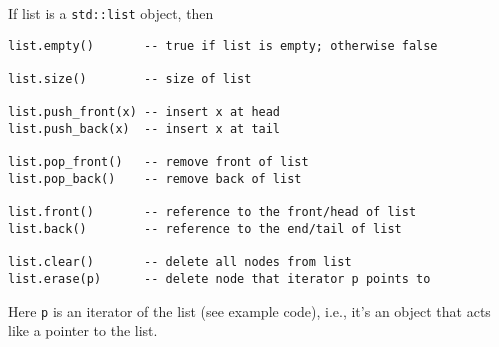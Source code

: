 If list is a \verb!std::list! object, then
{\small
\begin{Verbatim}[frame=single,fontsize=\footnotesize]
list.empty()       -- true if list is empty; otherwise false

list.size()        -- size of list

list.push_front(x) -- insert x at head
list.push_back(x)  -- insert x at tail

list.pop_front()   -- remove front of list
list.pop_back()    -- remove back of list

list.front()       -- reference to the front/head of list
list.back()        -- reference to the end/tail of list

list.clear()       -- delete all nodes from list
list.erase(p)      -- delete node that iterator p points to
\end{Verbatim}
Here \verb!p! is an iterator of the list (see example code), i.e.,
it's an object that acts like a pointer to the list.
}
